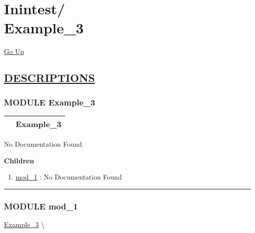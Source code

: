\chapter*{\color{headfile}
{\large Inintest\slash\hspace{0pt}}
 \\
Example_3
}
\hypertarget{ecldoc:toc:Inintest.Example_3}{}
\hyperlink{ecldoc:toc:root/Inintest}{Go Up}


\section*{\underline{\textsf{DESCRIPTIONS}}}
\subsection*{\textsf{\colorbox{headtoc}{\color{white} MODULE}
Example\_3}}

\hypertarget{ecldoc:Inintest.Example_3}{}

{\renewcommand{\arraystretch}{1.5}
\begin{tabularx}{\textwidth}{|>{\raggedright\arraybackslash}l|X|}
\hline
\hspace{0pt}\mytexttt{\color{red} } & \textbf{Example\_3} \\
\hline
\end{tabularx}
}

\par





No Documentation Found







\textbf{Children}
\begin{enumerate}
\item \hyperlink{ecldoc:Inintest.Example_3.mod_1}{mod\_1}
: No Documentation Found
\end{enumerate}

\rule{\linewidth}{0.5pt}

\subsection*{\textsf{\colorbox{headtoc}{\color{white} MODULE}
mod\_1}}

\hypertarget{ecldoc:Inintest.Example_3.mod_1}{}
\hspace{0pt} \hyperlink{ecldoc:Inintest.Example_3}{Example_3} \textbackslash 

